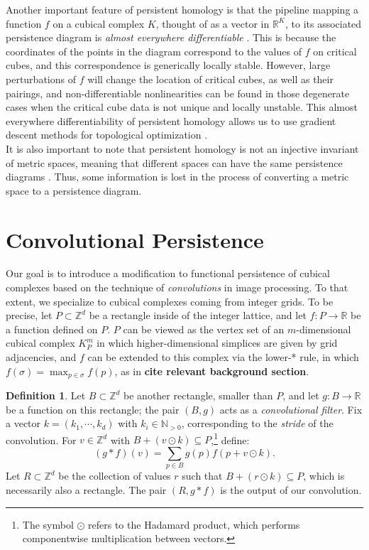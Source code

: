 \documentclass[conference]{IEEEtran}
\theoremstyle{definition}
\newtheorem{definition}[theorem]{Definition}
\numberwithin{figure}{section}
\begin{document}
Another important feature of persistent homology is that the pipeline mapping a function $f$ on a cubical complex $K$, thought of as a vector in $\mathbb{R}^K$, to its associated persistence diagram is  \emph{almost everywhere differentiable}  \cite{gameiro2016continuation,poulenard2018topological}. This is because the coordinates of the points in the diagram correspond to the values of $f$ on critical cubes, and this correspondence is generically locally stable. However, large perturbations of $f$ will change the location of critical cubes, as well as their pairings, and non-differentiable nonlinearities can be found in those degenerate cases when the critical cube data is not unique and locally unstable. This almost everywhere differentiability of persistent homology allows us to use gradient descent methods for topological optimization  \cite{carriere2021optimizing}.\\ 


It is also important to note that persistent homology is not an injective invariant of metric spaces, meaning that different spaces can have the same persistence diagrams \cite{curry2018fiber,leygonie2021fiber,leygonie2021algorithmic}. Thus, some information is lost in the process of converting a metric space to a persistence diagram.

\section{Convolutional Persistence}

Our goal is to introduce a modification to functional persistence of cubical complexes based on the technique of \emph{convolutions} in image processing. To that extent, we specialize to cubical complexes coming from integer grids. To be precise, let $P \subset \mathbb{Z}^d$ be a rectangle inside of the integer lattice, and let $f: P \to \mathbb{R}$ be a function defined on $P$. $P$ can be viewed as the vertex set of an $m$-dimensional cubical complex $K^{m}_{P}$ in which higher-dimensional simplices are given by grid adjacencies, and $f$ can be extended to this complex via the lower-* rule, in which $f(\sigma) = \max_{p \in \sigma}f(p)$, as in {\bf cite relevant background section}.\\

\begin{definition}
Let $B \subset \mathbb{Z}^d$ be another rectangle, smaller than $P$, and let $g: B \to \mathbb{R}$ be a function on this rectangle; the pair $(B,g)$ acts as a \emph{convolutional filter}. Fix a vector $k = (k_1, \cdots, k_d)$ with $k_i \in \mathbb{N}_{>0}$, corresponding to the \emph{stride} of the convolution. For $v \in \mathbb{Z}^d$ with $B + (v \odot k) \subseteq P$,\footnote{The symbol $\odot$ refers to the Hadamard product, which performs componentwise multiplication between vectors.} define:
\[(g \ast f)(v) = \sum_{p \in B} g(p)f(p+v \odot k).\]
Let $R \subset \mathbb{Z}^d$ be the collection of values $r$ such that $B + (r \odot k) \subseteq P$, which is necessarily also a rectangle. The pair $(R, g \ast f)$ is the output of our convolution.
\end{definition}
\end{document}

